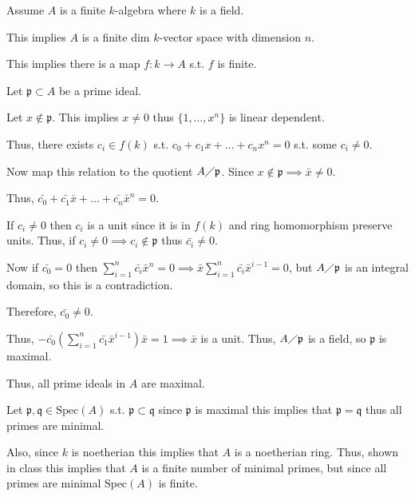 \documentclass[12pt, letterpaper]{article}
\newcommand{\p}{\mathfrak{p}}
\newcommand{\Spec}{\mathrm{Spec}}
\newcommand{\mf}[1]{\mathfrak{#1}}
\begin{document}
\begin{problemproof}
    Assume $A$ is a finite $k$-algebra where $k$ is a field.

    This implies $A$ is a finite dim $k$-vector space with dimension $n$.

    This implies there is a map $f : k \to A$ s.t. $f$ is finite.

    Let $\p \subset A$ be a prime ideal.

    Let $x \notin \p$. This implies $x \neq 0$ thus $\{1,\dots,x^n\}$ is linear dependent.

    Thus, there exists $c_i \in f(k)$ s.t. $c_0 + c_1x+\dots+c_nx^n=0$ s.t. some $c_i \neq 0$.

    Now map this relation to the quotient $A \diagup \p$. Since $x \notin \p \implies \bar{x} \neq 0$.

    Thus, $\bar{c_0} + \bar{c_1}\bar{x} + \dots + \bar{c_n}\bar{x}^n = 0$.

    If $c_i \neq 0$ then $c_i$ is a unit since it is in $f(k)$ and ring homomorphism preserve units. Thus, if $c_i \neq 0 \implies c_i \notin \p$ thus $\bar{c_i} \neq 0$.

    Now if $\bar{c_0} = 0$ then $\sum_{i=1}^n \bar{c_i}\bar{x}^n=0 \implies \bar{x} \sum_{i=1}^n \bar{c_i}\bar{x}^{i-1}=0$, but $A\diagup \p$ is an integral domain, so this is a contradiction.

    Therefore, $\bar{c_0} \neq 0$.

    Thus, $-\bar{c_0}(\sum_{i=1}^n \bar{c_1}\bar{x}^{i-1}) \bar{x} = 1 \implies \bar{x}$ is a unit. Thus, $A \diagup \p$ is a field, so $\p$ is maximal.

    Thus, all prime ideals in $A$ are maximal.
    
    Let $\p, \mf{q} \in \Spec(A)$ s.t. $\p \subset \mf{q}$ since $\p$ is maximal this implies that $\p = \mf{q}$ thus all primes are minimal.

    Also, since $k$ is noetherian this implies that $A$ is a noetherian ring. Thus, shown in class this implies that $A$ is a finite number of minimal primes, but since all primes are minimal $\Spec(A)$ is finite.
\end{problemproof}
\end{document}
